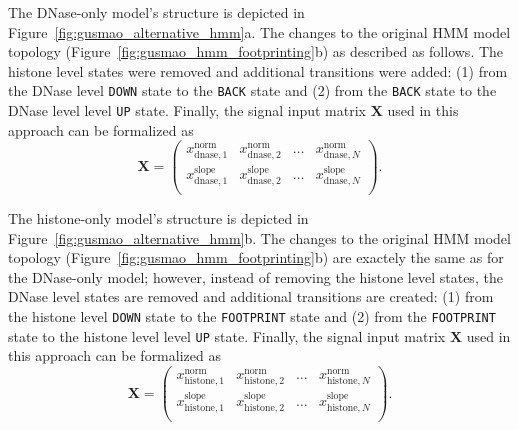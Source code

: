The DNase-only model's structure is depicted in Figure~\ref{fig:gusmao_alternative_hmm}a. The changes to the original HMM model topology (Figure~\ref{fig:gusmao_hmm_footprinting}b) as described as follows. The histone level states were removed and additional transitions were added: (1) from the DNase level {\tt DOWN} state to the {\tt BACK} state and (2) from the {\tt BACK} state to the DNase level level {\tt UP} state. Finally, the signal input matrix $ \mathbf{X} $ used in this approach can be formalized as
\begin{equation}
  \label{eq:signal.matrix.dnase}
  \mathbf{X} = 
  \begin{pmatrix}
    x^{\text{norm}}_{\text{dnase},1} & x^{\text{norm}}_{\text{dnase},2} & \dots & x^{\text{norm}}_{\text{dnase},N} \\[1em]
    x^{\text{slope}}_{\text{dnase},1} & x^{\text{slope}}_{\text{dnase},2} & \dots & x^{\text{slope}}_{\text{dnase},N} \\
  \end{pmatrix}.
\end{equation}

The histone-only model's structure is depicted in Figure~\ref{fig:gusmao_alternative_hmm}b. The changes to the original HMM model topology (Figure~\ref{fig:gusmao_hmm_footprinting}b) are exactely the same as for the DNase-only model; however, instead of removing the histone level states, the DNase level states are removed and additional transitions are created: (1) from the histone level {\tt DOWN} state to the {\tt FOOTPRINT} state and (2) from the {\tt FOOTPRINT} state to the histone level level {\tt UP} state. Finally, the signal input matrix $ \mathbf{X} $ used in this approach can be formalized as
\begin{equation}
  \label{eq:signal.matrix.histone}
  \mathbf{X} = 
  \begin{pmatrix}
    x^{\text{norm}}_{\text{histone},1} & x^{\text{norm}}_{\text{histone},2} & \dots & x^{\text{norm}}_{\text{histone},N} \\[1em]
    x^{\text{slope}}_{\text{histone},1} & x^{\text{slope}}_{\text{histone},2} & \dots & x^{\text{slope}}_{\text{histone},N} \\
  \end{pmatrix}.
\end{equation}


